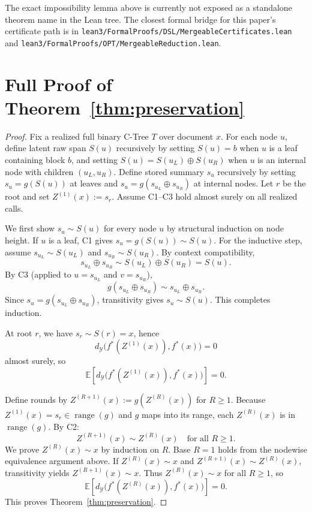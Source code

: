 \documentclass[11pt]{article}
\newcommand{\E}{\mathbb{E}}
\newcommand{\Y}{\mathcal{Y}}
\newcommand{\metric}{d_{\Y}}
\newcommand{\fstar}{f^\ast}
\newcommand{\concat}{\oplus}
\begin{document}
The exact impossibility lemma above is currently not exposed as a standalone theorem name in the Lean tree.
The closest formal bridge for this paper's certificate path is in
\texttt{lean3/FormalProofs/DSL/MergeableCertificates.lean} and
\texttt{lean3/FormalProofs/OPT/MergeableReduction.lean}.

\section{Full Proof of Theorem~\ref{thm:preservation}}\label{app:proof-preservation}

\begin{proof}
Fix a realized full binary C-Tree $T$ over document $x$.
For each node $u$, define latent raw span $S(u)$ recursively by setting $S(u)=b$ when $u$ is a leaf containing block $b$, and setting $S(u)=S(u_L)\concat S(u_R)$ when $u$ is an internal node with children $(u_L,u_R)$.
Define stored summary $s_u$ recursively by setting $s_u=g(S(u))$ at leaves and $s_u=g(s_{u_L}\concat s_{u_R})$ at internal nodes.
Let $r$ be the root and set $Z^{(1)}(x):=s_r$.
Assume C1--C3 hold almost surely on all realized calls.

We first show $s_u\sim S(u)$ for every node $u$ by structural induction on node height. If $u$ is a leaf, C1 gives $s_u=g(S(u))\sim S(u)$. For the inductive step, assume $s_{u_L}\sim S(u_L)$ and $s_{u_R}\sim S(u_R)$.
By context compatibility,
\[
s_{u_L}\concat s_{u_R}\sim S(u_L)\concat S(u_R)=S(u).
\]
By C3 (applied to $u=s_{u_L}$ and $v=s_{u_R}$),
\[
g(s_{u_L}\concat s_{u_R})\sim s_{u_L}\concat s_{u_R}.
\]
Since $s_u=g(s_{u_L}\concat s_{u_R})$, transitivity gives $s_u\sim S(u)$.
This completes induction.

At root $r$, we have $s_r\sim S(r)=x$, hence
\[
\metric\!\big(\fstar(Z^{(1)}(x)),\fstar(x)\big)=0
\]
almost surely, so
\[
\E\!\left[\metric\!\big(\fstar(Z^{(1)}(x)),\fstar(x)\big)\right]=0.
\]

Define rounds by $Z^{(R+1)}(x):=g(Z^{(R)}(x))$ for $R\ge1$.
Because $Z^{(1)}(x)=s_r\in\operatorname{range}(g)$ and $g$ maps into its range, each $Z^{(R)}(x)$ is in $\operatorname{range}(g)$.
By C2:
\[
Z^{(R+1)}(x)\sim Z^{(R)}(x)\quad\text{for all }R\ge1.
\]
We prove $Z^{(R)}(x)\sim x$ by induction on $R$.
Base $R=1$ holds from the nodewise equivalence argument above.
If $Z^{(R)}(x)\sim x$ and $Z^{(R+1)}(x)\sim Z^{(R)}(x)$, transitivity yields $Z^{(R+1)}(x)\sim x$.
Thus $Z^{(R)}(x)\sim x$ for all $R\ge1$, so
\[
\E\!\left[\metric\!\big(\fstar(Z^{(R)}(x)),\fstar(x)\big)\right]=0.
\]
This proves Theorem~\ref{thm:preservation}.
\end{proof}
\end{document}
